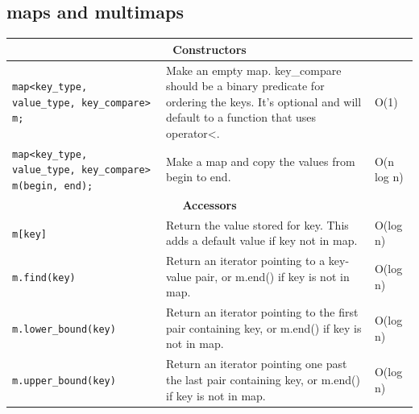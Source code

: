 \documentclass[12 pt, twoside] {article}
\begin{document}
{\subsection*{maps and multimaps}

\begin{table}[h]
\centering
\begin{tabular}{|p{}|p{}|l|}
\hline
\multicolumn{3}{|c|}{\textbf{Constructors}}                                                                                                                                                                                                                \\ \hline
\texttt{map<key\_type, value\_type, key\_compare> m;}             & Make an empty map. key\_compare should be a binary predicate for ordering the keys. It's optional and will default to a function that uses operator\textless. & O(1)       \\ \hline
\texttt{map<key\_type, value\_type, key\_compare> m(begin, end);} & Make a map and copy the values from begin to end.                                                                                                             & O(n log n) \\ \hline
\multicolumn{3}{|c|}{\textbf{Accessors}}                                                                                                                                                                                                                   \\ \hline
\texttt{m{[}key{]}           }                                                         & Return the value stored for key. This adds a default value if key not in map.                                                                                 & O(log n)   \\ \hline
\texttt{m.find(key)          }                                                         & Return an iterator pointing to a key-value pair, or m.end() if key is not in map.                                                                             & O(log n)   \\ \hline
\texttt{m.lower\_bound(key)  }                                                         & Return an iterator pointing to the first pair containing key, or m.end() if key is not in map.                                                                & O(log n)   \\ \hline
\texttt{m.upper\_bound(key)  }                                                         & Return an iterator pointing one past the last pair containing key, or m.end() if key is not in map.                                                           & O(log n)   \\ \hline

\end{tabular}
\end{table}}
\end{document}
